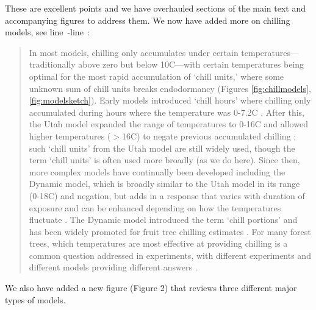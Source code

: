 \documentclass[11pt]{article}
\newcommand{\lr}[1]{line~\lineref{#1}}
\begin{document}
These are excellent points and we have overhauled sections of the main text and accompanying figures to address them. We now have added more on chilling models, see \lr{r2modelsplsS}-\lr{r2modelsplsE}:
\begin{quote}
In most models, chilling only accumulates under certain temperatures---traditionally above zero but below 10\degree C---with certain temperatures being optimal for the most rapid accumulation of `chill units,' where some unknown sum of chill units breaks endodormancy (Figures \ref{fig:chillmodels}, \ref{fig:modelsketch}). Early models introduced `chill hours' where chilling only accumulated during hours where the temperature was 0-7.2\degree C \citep[corresponding to the range of 32-45\degree F developed for peach trees,][]{weinberger}. After this, the Utah model expanded the range of temperatures to 0-16\degree C and allowed higher temperatures ($>$16\degree C) to negate previous accumulated chilling \citep{richardson1974}; such `chill units' from the Utah model are still widely used, though the term `chill units' is often used more broadly (as we do here). Since then, more complex models have continually been developed including the Dynamic model, which is broadly similar to the Utah model in its range (0-18\degree C) and negation, but adds in a response that varies with duration of exposure and can be enhanced depending on how the temperatures fluctuate \citep{erez1987evaluation,erez1997dynamic,fishman1987temperature}. The Dynamic model introduced the term `chill portions' and has been widely promoted for fruit tree chilling estimates \citep{lued2009,luedeling2021phenoflex}. For many forest trees, which temperatures are most effective at providing chilling is a common question addressed in experiments, with different experiments and different models providing different answers \citep{vitasselev,baum2021}.
\end{quote}
We also have added a new figure (Figure 2) that reviews three different major types of models. 
\end{document}
